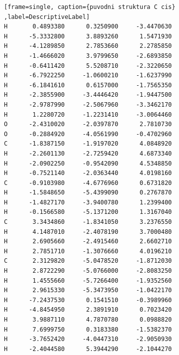 \documentclass[
digital, %
table,   %
lof,     %
lot,     %
oneside,
]{fithesis3}
\begin{document}
\begin{lstlisting}[frame=single, caption={puvodni struktura C cis} ,label=DescriptiveLabel]
H       0.4893380      0.3250900     -3.4470630
H      -5.3332800      3.8893260      1.5471930
H      -4.1289850      2.7853660      2.2785850
H      -1.4666020      3.9799650     -2.6893850
H      -0.6411420      5.5208710     -2.3220650
H      -6.7922250     -1.0600210     -1.6237990
H      -6.1841610      0.6157000     -1.7565350
H      -2.3855900     -3.4446420     -1.9447500
H      -2.9787990     -2.5067960     -3.3462170
H       1.2280720     -1.2231410     -3.0064460
O      -2.4310020     -2.0397870      2.7810730
O      -0.2884920     -4.0561990     -0.4702960
C      -1.8387150     -1.9197020      4.0848920
H      -2.2601130     -2.7259420      4.6873340
H      -2.0902250     -0.9542090      4.5348850
H      -0.7521140     -2.0363440      4.0198160
C      -0.9103980     -4.6776960      0.6731820
H      -1.5848650     -5.4399090      0.2767870
H      -1.4827170     -3.9400780      1.2399400
H      -0.1566580     -5.1371200      1.3167040
C       3.3434860     -1.8341050      3.2376550
H       4.1487010     -2.4078190      3.7000480
H       2.6905660     -2.4915460      2.6602710
H       2.7851710     -1.3076660      4.0196210
C       2.3129820     -5.0478520     -1.8712030
H       2.8722290     -5.0766000     -2.8083250
H       1.4555660     -5.7266400     -1.9352560
H       2.9615330     -5.3473950     -1.0422170
H      -7.2437530      0.1541510     -0.3989960
H      -4.8454950      2.3891910      0.7023420
H       3.9887110      4.7870780      0.0988820
H       7.6999750      0.3183380     -1.5382370
H      -3.7652420     -4.0447310     -2.9050930
H      -2.4044580      5.3944290     -2.1044270

\end{lstlisting}
\newpage
\end{document}
